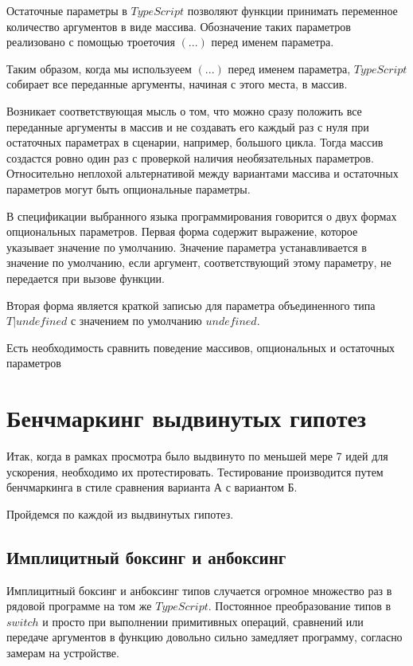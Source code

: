 \documentclass{mipt-thesis-bs}
\begin{document}
Остаточные параметры в $TypeScript$ позволяют функции
принимать переменное количество аргументов в виде массива.
Обозначение таких параметров реализовано с помощью троеточия $(...)$
перед именем параметра.

Таким образом, когда мы используеем $(...)$ перед именем параметра,
$TypeScript$ собирает все переданные аргументы, начиная с этого места, в массив.

Возникает соответствующая мысль о том, что можно сразу положить все переданные
аргументы в массив и не создавать его каждый раз с нуля при остаточных параметрах
в сценарии, например, большого цикла. Тогда массив создастся ровно один раз с проверкой
наличия необязательных параметров. Относительно неплохой альтернативой между
вариантами массива и остаточных параметров могут быть опциональные параметры.

В спецификации выбранного языка программирования говорится о двух формах
опциональных параметров. Первая форма содержит выражение, которое
указывает значение по умолчанию. Значение параметра устанавливается
в значение по умолчанию, если аргумент, соответствующий
этому параметру, не передается при вызове функции.

Вторая форма является краткой записью для параметра объединенного типа
$T | undefined$ с значением по умолчанию $undefined$.

Есть необходимость сравнить поведение массивов, опциональных и остаточных параметров

\section{Бенчмаркинг выдвинутых гипотез}

Итак, когда в рамках просмотра было выдвинуто по меньшей мере 7 идей для ускорения,
необходимо их протестировать. Тестирование производится путем бенчмаркинга в стиле
сравнения варианта А с вариантом Б.

Пройдемся по каждой из выдвинутых гипотез.
\subsection{Имплицитный боксинг и анбоксинг}
Имплицитный боксинг и анбоксинг типов случается огромное множество раз в рядовой программе
на том же $TypeScript$. Постоянное преобразование типов в $switch$ и просто при выполнении
примитивных операций, сравнений или передаче аргументов в функцию довольно сильно замедляет
программу, согласно замерам на устройстве.
\end{document}
